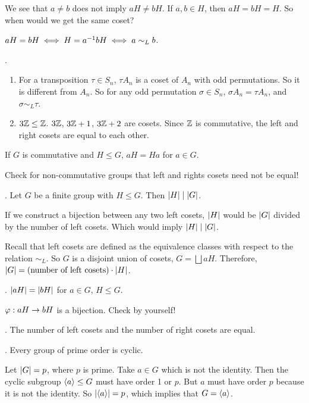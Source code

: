 We see that \(a \neq b\) does not imply \(aH \neq bH\). If \(a, b\in H\), then \(aH = bH = H\). So when would we get the same coset?

\rmk\(aH = bH \iff H = a^{-1} b H \iff a \sim_L b\).

\ex.
\begin{enumerate}
    \item For a transposition \(\tau \in S_n\), \(\tau A_n\) is a coset of \(A_n\) with odd permutations. So it is different from \(A_n\). So for any odd permutation \(\sigma \in S_n\), \(\sigma A_n = \tau A_n\), and \(\sigma \sim_L \tau\).
    \item \(3\mathbb{Z} \leq \mathbb{Z}\). \(3\mathbb{Z}\), \(3\mathbb{Z} + 1\), \(3\mathbb{Z} + 2\) are cosets. Since \(\mathbb{Z}\) is commutative, the left and right cosets are equal to each other.
\end{enumerate}

\rmk If \(G\) is commutative and \(H \leq G\), \(aH = Ha\) for \(a \in G\).

Check for non-commutative groups that left and rights cosets need not be equal!

\medskip

\thm.  Let \(G\) be a finite group with \(H \leq G\). Then \(\left| H \right| \mid \left| G \right|\).

\pf If we construct a bijection between any two left cosets, \(\left| H \right|\) would be \(\left| G \right|\) divided by the number of left cosets. Which would imply \(\left| H \right| \mid \left| G \right|\).

Recall that left cosets are defined as the equivalence classes with respect to the relation \(\sim_L\). So \(G\) is a disjoint union of cosets, \(G = \bigsqcup aH\). Therefore, \(\left| G \right| = \text{(number of left cosets)} \cdot \left| H \right|\).

\lemma. \(\left| aH \right| = \left| bH \right|\) for \(a \in G\), \(H \leq G\).

\pf \(\varphi : aH \rightarrow bH\) is a bijection. Check by yourself!

\cor. The number of left cosets and the number of right cosets are equal.

\medskip

\cor. Every group of prime order is cyclic.

\pf Let \(\left| G \right| = p\), where \(p\) is prime. Take \(a \in G\) which is not the identity. Then the cyclic subgroup \(\left\langle a \right\rangle \leq G\) must have order 1 or \(p\). But \(a\) must have order \(p\) because it is not the identity. So \(\left| \left\langle a \right\rangle \right| = p\), which implies that \(G = \left\langle a \right\rangle\).

